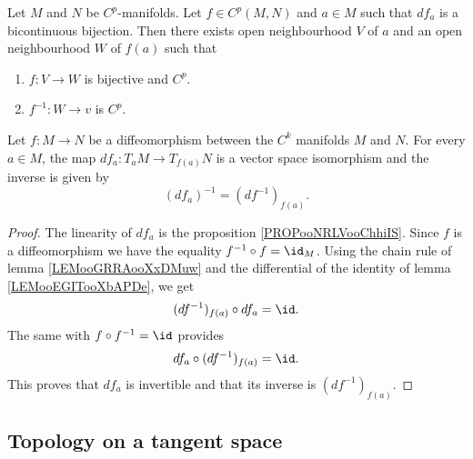 \begin{theorem}	\label{THOooUTSRooTqBegO}
	Let \( M\) and \( N\) be \( C^p\)-manifolds. Let \( f\in C^p(M,N)\) and \( a\in M\) such that \( df_a\) is a bicontinuous bijection. Then there exists open neighbourhood \( V\) of \( a\) and an open neighbourhood \( W\) of \( f(a)\) such that
	\begin{enumerate}
		\item
		      \(f \colon V\to W  \) is bijective and \( C^p\).
		\item
		      \(f^{-1} \colon W\to v  \) is \( C^p\).
	\end{enumerate}
\end{theorem}



\begin{proposition}       \label{PROPooPEMLooPQcywG}
	Let \( f\colon M\to N\) be a diffeomorphism between the \( C^k\) manifolds \( M\) and \( N\). For every \( a\in M\), the map \( df_a\colon T_aM\to T_{f(a)}N\) is a vector space isomorphism and the inverse is given by
	\begin{equation}
		(df_a)^{-1}=(df^{-1})_{f(a)}.
	\end{equation}
\end{proposition}

\begin{proof}
	The linearity of \( df_a\) is the proposition \ref{PROPooNRLVooChhiIS}. Since \( f\) is a diffeomorphism we have the equality \( f^{-1}\circ f=\id_M\). Using the chain rule of lemma \ref{LEMooGRRAooXxDMuw} and the differential of the identity of lemma \ref{LEMooEGITooXbAPDe}, we get
	\begin{equation}
		(df^{-1})_{f(a)}\circ df_a=\id.
	\end{equation}
	The same with \( f\circ f^{-1}=\id\) provides
	\begin{equation}
		df_a\circ(df^{-1})_{f(a)}=\id.
	\end{equation}
	This proves that \( df_a\) is invertible and that its inverse is \( (df^{-1})_{f(a)}\).


\end{proof}

\subsection{Topology on a tangent space}

